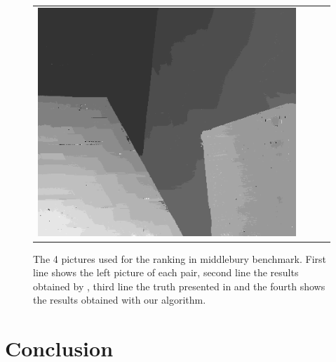 \documentclass{article}
\begin{document}
\begin{figure}[h]
\begin{center}
\begin{tabular}{cccc}
\includegraphics[scale=0.225]{Images/practical_results/venus.png}\\
\end{tabular}
	\caption{The 4 pictures used for the ranking in middlebury benchmark. First line shows the left picture of each pair, second line the results obtained by \cite{adCensus}, third line the truth presented in \cite{middleBench} and the fourth shows the results obtained with our algorithm.}
	\label{middlPics}
\end{center}
\end{figure}

\newpage

\section{Conclusion}

\newpage
\end{document}
